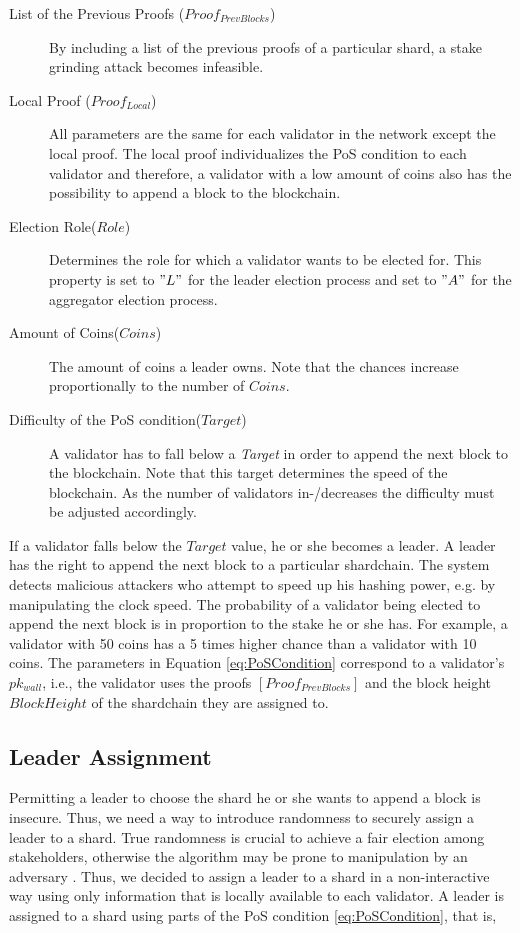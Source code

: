 \begin{description}
  \item[List of the Previous Proofs ($Proof_{PrevBlocks}$)] By including a list of the previous proofs of a particular shard, a stake grinding attack becomes infeasible.
  \item[Local Proof ($Proof_{Local}$)] All parameters are the same for each validator in the network except the local proof. The local proof individualizes the PoS condition to each validator and therefore, a validator with a low amount of coins also has the possibility to append a block to the blockchain.
  \item[Election Role($Role$)] Determines the role for which a validator wants to be elected for. This property is set to $"L"$ for the leader election process and set to $"A"$ for the aggregator election process.
  \item[Amount of Coins($Coins$)] The amount of coins a leader owns. Note that the chances increase proportionally to the number of $Coins$.
  \item[Difficulty of the PoS condition($Target$)] A validator has to fall below a \textit{Target} in order to append the next block to the blockchain. Note that this target determines the speed of the blockchain. As the number of validators in-/decreases the difficulty must be adjusted accordingly.
\end{description}

If a validator falls below the $Target$ value, he or she becomes a leader. A leader has the right to append the next block to a particular shardchain. The system detects malicious attackers who attempt to speed up his hashing power, e.g. by manipulating the clock speed. The probability of a validator being elected to append the next block is in proportion to the stake he or she has. For example, a validator with 50 coins has a 5 times higher chance than a validator with 10 coins. The parameters in Equation \ref{eq:PoSCondition} correspond to a validator's $pk_{wall}$, i.e., the validator uses the proofs $[Proof_{PrevBlocks}]$ and the block height $BlockHeight$ of the shardchain they are assigned to.

\subsection{Leader Assignment}
\label{Design:LeaderAssignment}

Permitting a leader to choose the shard he or she wants to append a block is insecure. Thus, we need a way to introduce randomness to securely assign a leader to a shard. True randomness is crucial to achieve a fair election among stakeholders, otherwise the algorithm may be prone to manipulation by an adversary \parencite{Ouroboros2016}. Thus, we decided to assign a leader to a shard in a non-interactive way using only information that is locally available to each validator. A leader is assigned to a shard using parts of the PoS condition \ref{eq:PoSCondition}, that is, 

